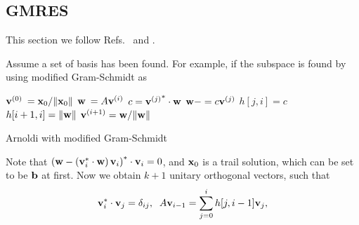 \subsection{\label{sec:GMRES}GMRES}

This section we follow Refs.~\cite{templates} and \cite{sparselinearbook1}.

Assume a set of basis has been found. For example, if the subspace is found by using modified Gram-Schmidt as
\begin{algorithm}[H]
\begin{algorithmic}
\State ${\bf v}^{(0)}\:={\bf x}_0/\|{\bf x}_0\|$
    \State ${\bf w}\:=A{\bf v}^{(i)}$
        \State $c={{\bf v}^{(j)}}^*\cdot {\bf w}$
        \State ${\bf w}-=c{\bf v}^{(j)}$
        \State $h[j,i]=c$
    \EndFor
    \State $h[i+1,i]=\|{\bf w}\|$
    \State ${\bf v}^{(i+1)}={\bf w}/\|{\bf w}\|$
\EndFor
\end{algorithmic}
\caption{Arnoldi with modified Gram-Schmidt}
\end{algorithm}

Note that $\left({\bf w}-\left({\bf v}_i^*\cdot {\bf w}\right){\bf v}_i\right)^* \cdot {\bf v}_i=0$, and ${\bf x}_0$ is a trail solution, which can be set to be ${\bf b}$ at first. Now we obtain $k+1$ unitary orthogonal vectors, such that
\begin{equation}
\begin{split}
&{\bf v}_i^*\cdot {\bf v}_j=\delta _{ij},\;\;A{\bf v}_{i-1}=\sum _{j=0}^i h[j,i-1]{\bf v}_j,\\
\end{split}
\end{equation}

